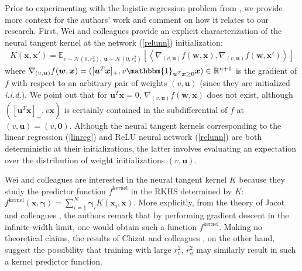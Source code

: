 \documentclass{article}
\begin{document}
Prior to experimenting with the logistic regression problem from \cite{wei2019regularization}, we provide more context for the authors' work and comment on how it relates to our research. First, Wei and colleagues provide an explicit characterization of the neural tangent kernel at the network (\ref{relunn}) initialization:
\begin{align*}
    K(\boldsymbol{x}, \boldsymbol{x}') = \mathbb{E}_{v \sim \mathcal{N}(0, r_v^2), \ \boldsymbol{u} \sim \mathcal{N}(0, r_u^2)}[ \left\langle \nabla_{(v, \boldsymbol{u})}f(\boldsymbol{w}, \boldsymbol{x}),  \nabla_{(v, \boldsymbol{u})}f(\boldsymbol{w}, \boldsymbol{x}') \right\rangle]
\end{align*}
where $\nabla_{(v, \boldsymbol{u})}f(\boldsymbol{w}, \boldsymbol{x}) = ([\boldsymbol{u}^T\boldsymbol{x}]_+, v\mathbbm{1}_{\boldsymbol{u}^T\boldsymbol{x} \geq 0}\boldsymbol{x}) \in \mathbb{R}^{n + 1}$ is the gradient of $f$ with respect to an arbitrary pair of weights $(v, \boldsymbol{u})$ (since they are initialized \textit{i.i.d.}). We point out that for $\boldsymbol{u}^T\boldsymbol{x}=0$, $\nabla_{(v, \boldsymbol{u})}f(\boldsymbol{w}, \boldsymbol{x})$ does not exist, although $([\boldsymbol{u}^T\boldsymbol{x}]_+, v\boldsymbol{x})$ is certainly contained in the subdifferential of $f$ at $(v, \boldsymbol{u}) = (v, \boldsymbol{0})$. Although the neural tangent kernels corresponding to the linear regression (\ref{linreg}) and ReLU neural network (\ref{relunn}) are both deterministic at their initializations, the latter involves evaluating an expectation over the distribution of weight initializations $(v, \boldsymbol{u})$.

Wei and colleagues are interested in the neural tangent kernel $K$ because they study the predictor function $f^{\text{kernel}}$ in the RKHS determined by $K$: $f^{\text{kernel}}(\boldsymbol{x}, \boldsymbol{\gamma}) = \sum_{i=1}^N \boldsymbol{\gamma}_i K(\boldsymbol{x}_i, \boldsymbol{x})$. More explicitly, from the theory of Jacot and colleagues \cite{jacot2018neural}, the authors remark that by performing gradient descent in the infinite-width limit, one would obtain such a function $f^{\text{kernel}}$. Making no theoretical claims, the results of Chizat and colleagues \cite{chizat2018lazy}, on the other hand, suggest the possibility that training with large $r_v^2$, $r_u^2$ may similarly result in such a kernel predictor function.
\end{document}
